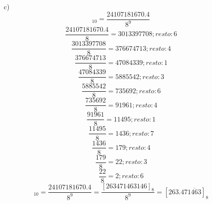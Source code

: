 \documentclass{article}
\begin{document}
\begin{enumerate}
\item[c)] \begin{equation*}[179.6125]_{10} = \frac{24107181670.4}{8^{9}}\end{equation*}\begin{equation*} \frac{24107181670.4}{8} =  3013397708;  resto: 6\end{equation*}\begin{equation*} \frac{3013397708}{8} =  376674713;  resto: 4\end{equation*}\begin{equation*} \frac{376674713}{8} =  47084339;  resto: 1\end{equation*}\begin{equation*} \frac{47084339}{8} =  5885542;  resto: 3\end{equation*}\begin{equation*} \frac{5885542}{8} =  735692;  resto: 6\end{equation*}\begin{equation*} \frac{735692}{8} =  91961;  resto: 4\end{equation*}\begin{equation*} \frac{91961}{8} =  11495;  resto: 1\end{equation*}\begin{equation*} \frac{11495}{8} =  1436;  resto: 7\end{equation*}\begin{equation*} \frac{1436}{8} =  179;  resto: 4\end{equation*}\begin{equation*} \frac{179}{8} =  22;  resto: 3\end{equation*}\begin{equation*} \frac{22}{8} =  2;  resto: 6\end{equation*}\begin{equation*}[179.6125]_{10} = \frac{24107181670.4}{8^{9}} = \frac{[263471463146]_{8}}{8^{9}} = [263.47\overline{1463}]_8\end{equation*}

\end{enumerate}
\end{document}
